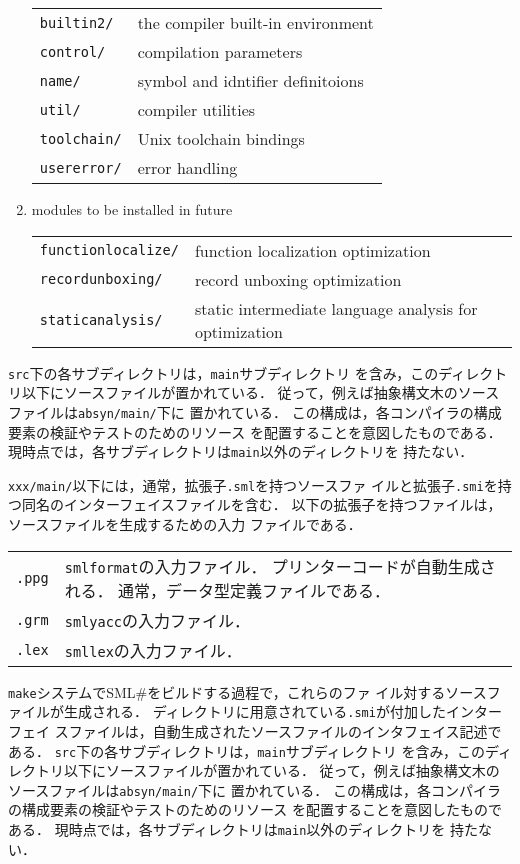\documentclass{jbook}
\newcommand{\smlsharp}{SML\#}
\newcommand{\code}[1]{\mbox{\large\tt #1}}
\begin{document}
\begin{enumerate}
\begin{tabular}{ll}
\code{builtin2/}& the compiler built-in environment
\\
\code{control/}& compilation parameters
\\
\code{name/}& symbol and idntifier definitoions
\\
\code{util/}& compiler utilities
\\
\code{toolchain/}& Unix toolchain bindings
\\
\code{usererror/}& error handling
\end{tabular}

\item modules to be installed in future

\begin{tabular}{ll}
\code{functionlocalize/}& function localization optimization
\\
\code{recordunboxing/}& record unboxing optimization
\\
\code{staticanalysis/}& static intermediate language analysis for optimization
\end{tabular}
\end{enumerate}
\fi%

\ifjp%
	\code{src}下の各サブディレクトリは，\code{main}サブディレクトリ
を含み，このディレクトリ以下にソースファイルが置かれている．
	従って，例えば抽象構文木のソースファイルは\code{absyn/main/}下に
置かれている．
	この構成は，各コンパイラの構成要素の検証やテストのためのリソース
を配置することを意図したものである．
	現時点では，各サブディレクトリは\code{main}以外のディレクトリを
持たない．

	\code{xxx/main/}以下には，通常，拡張子\code{.sml}を持つソースファ
イルと拡張子\code{.smi}を持つ同名のインターフェイスファイルを含む．
	以下の拡張子を持つファイルは，ソースファイルを生成するための入力
ファイルである．

\begin{tabular}{ll}
\code{.ppg} &
\code{smlformat}の入力ファイル．
プリンターコードが自動生成される．
通常，データ型定義ファイルである．
\\
\code{.grm} &
\code{smlyacc}の入力ファイル．
\\
\code{.lex} &
\code{smllex}の入力ファイル．
\end{tabular}

	\code{make}システムで\smlsharp{}をビルドする過程で，これらのファ
イル対するソースファイルが生成される．
	ディレクトリに用意されている\code{.smi}が付加したインターフェイ
スファイルは，自動生成されたソースファイルのインタフェイス記述である．
\else%
	\code{src}下の各サブディレクトリは，\code{main}サブディレクトリ
を含み，このディレクトリ以下にソースファイルが置かれている．
	従って，例えば抽象構文木のソースファイルは\code{absyn/main/}下に
置かれている．
	この構成は，各コンパイラの構成要素の検証やテストのためのリソース
を配置することを意図したものである．
	現時点では，各サブディレクトリは\code{main}以外のディレクトリを
持たない．
\end{document}
